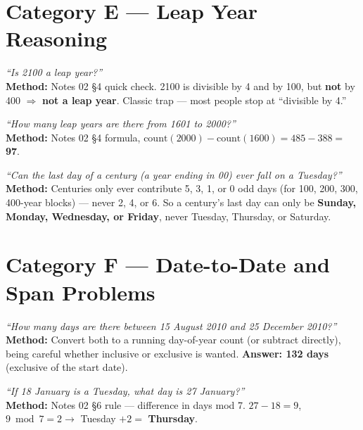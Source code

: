 \documentclass[11pt]{article}
\begin{document}
\section{Category E --- Leap Year Reasoning}

\begin{examplebox}
\emph{``Is 2100 a leap year?''} \\
\textbf{Method:} Notes 02 \S4 quick check. 2100 is divisible by 4 and by 100, but \textbf{not} by
400 $\Rightarrow$ \textbf{not a leap year}. Classic trap --- most people stop at ``divisible by 4.''
\end{examplebox}

\begin{examplebox}
\emph{``How many leap years are there from 1601 to 2000?''} \\
\textbf{Method:} Notes 02 \S4 formula, $\text{count}(2000)-\text{count}(1600) = 485-388 = $
\textbf{97}.
\end{examplebox}

\begin{examplebox}
\emph{``Can the last day of a century (a year ending in 00) ever fall on a Tuesday?''} \\
\textbf{Method:} Centuries only ever contribute 5, 3, 1, or 0 odd days (for 100, 200, 300, 400-year
blocks) --- never 2, 4, or 6. So a century's last day can only be \textbf{Sunday, Monday, Wednesday,
or Friday}, never Tuesday, Thursday, or Saturday.
\end{examplebox}

\section{Category F --- Date-to-Date and Span Problems}

\begin{examplebox}
\emph{``How many days are there between 15 August 2010 and 25 December 2010?''} \\
\textbf{Method:} Convert both to a running day-of-year count (or subtract directly), being careful
whether inclusive or exclusive is wanted. \textbf{Answer: 132 days} (exclusive of the start date).
\end{examplebox}

\begin{examplebox}
\emph{``If 18 January is a Tuesday, what day is 27 January?''} \\
\textbf{Method:} Notes 02 \S6 rule --- difference in days mod 7. $27-18=9$, $9 \bmod 7 = 2 \to$
Tuesday $+2 = $ \textbf{Thursday}.
\end{examplebox}
\end{document}
